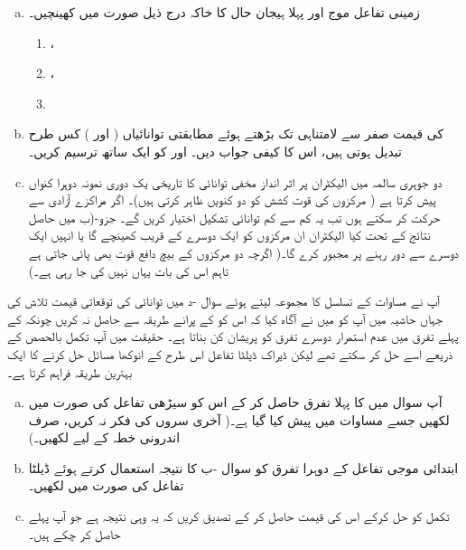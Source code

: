 \begin{enumerate}[a.]
\item
زمینی تفاعل موج  اور پہلا ہیجان حال  کا خاکہ درج ذیل صورت میں کھینچیں۔
\begin{multicols}{3}
\begin{enumerate}[1.]
\item
 ،
 \item
 ،
\item 
 \end{enumerate}
 \end{multicols}
\item
  کی قیمت صفر سے لامتناہی تک بڑھتے ہوئے مطابقتی توانائیاں ( اور ) کس طرح تبدیل ہوتی ہیں، اس کا کیفی جواب دیں۔  اور  کو ایک ساتھ ترسیم کریں۔
\item
 دو جوہری سالمہ میں الیکٹران پر اثر انداز مخفی توانائی کا تاریخی یک دوری نمونہ دوہرا کنواں پیش کرتا ہے ( مرکزوں کی قوت کشش کو دو کنویں ظاہر کرتی ہیں)۔ اگر مراکزے آزادی سے حرکت کر سکتے ہوں تب یہ کم سے کم توانائی تشکیل اختیار کریں گے۔ جزو-(ب میں حاصل نتائج کے تحت کیا الیکٹران ان مرکزوں کو ایک دوسرے کے قریب کھینچے گا یا انہیں ایک دوسرے سے دور رہنے پر مجبور کرے گا۔( اگرچہ دو مرکزوں کے بیچ دافع قوت بھی پائی جاتی ہے تاہم اس کی بات یہاں نہیں کی جا رہی ہے۔)
\end{enumerate}
آپ نے مساوات  کے تسلسل کا مجموعہ لیتے ہوئے سوال -د میں توانائی کی توقعاتی قیمت تلاش کی جہاں حاشیہ میں آپ کو میں نے آگاہ کیا کہ اس کو  کے پرانے طریقہ سے حاصل نہ کریں چونکہ  کے پہلے تفرق میں عدم استمرار دوسرے تفرق کو پریشان کن بناتا ہے۔ حقیقت میں آپ تکمل بالحصص کے ذریعے اسے حل کر سکتے تھے لیکن ڈیراک ڈیلٹا تفاعل اس طرح کے انوکھا مسائل حل کرنے کا ایک بہترین طریقہ فراہم کرتا ہے۔
\begin{enumerate}[a.]
\item
 آپ سوال  میں  کا پہلا تفرق حاصل کر کے اس کو سیڑھی تفاعل  کی صورت میں لکھیں جسے مساوات  میں پیش کیا گیا ہے۔( آخری سروں کی فکر نہ کریں، صرف اندرونی خطہ  کے لیے لکھیں۔)
\item
 ابتدائی موجی تفاعل  کے دوہرا تفرق کو سوال -ب کا نتیجہ استعمال کرتے ہوئے ڈیلٹا تفاعل کی صورت میں لکھیں۔
\item
 تکمل  کو حل کرکے اس کی قیمت حاصل کر کے تصدیق کریں کہ یہ وہی نتیجہ ہے جو آپ پہلے حاصل کر چکے ہیں۔
\end{enumerate}
